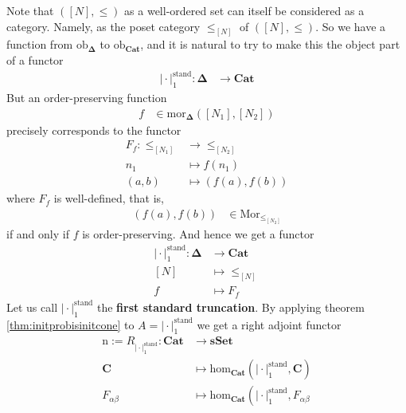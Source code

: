 \begin{cst}[Nerve]
\label{cst:nerve}
Note that $([N],\leq)$ as a well-ordered set can itself be considered as a category.
Namely, as the poset category $\pmb{\leq}_{[N]}$ of $([N],\leq)$.
So we have a function from $\mathrm{ob}_{\mathbf{\Delta}}$ to $\mathrm{ob}_{\mathbf{Cat}}$, and it is natural to try to make this the object part of a functor
\begin{align*}
  \vert
    \cdot
  \vert_{1}^{\textrm{stand}}
  \colon
  \mathbf{\Delta}
  &\rightarrow
  \mathbf{Cat}
\end{align*}
But an order-preserving function
\begin{align*}
  f
  &\in
  \mathrm{mor}_{\mathbf{\Delta}}
  \left(
    [N_{1}],
    [N_{2}]
  \right)
\end{align*}
precisely corresponds to the functor
\begin{align*}
  F_{f}
  \colon
  \pmb{\leq}_{[N_{1}]}
  &\rightarrow
  \pmb{\leq}_{[N_{2}]}
  \\
  n_{1}
  &\mapsto
  f(n_{1})
  \\
  (a,b)
  &\mapsto
  (f(a),f(b))
\end{align*}
where $F_{f}$ is well-defined, that is,
\begin{align*}
  (f(a),f(b))
  &\in
  \mathrm{Mor}_{\pmb{\leq}_{[N_{2}]}}
\end{align*}
if and only if $f$ is order-preserving.
And hence we get a functor
\begin{align*}
  \vert
    \cdot
  \vert_{1}^{\textrm{stand}}
  \colon
  \mathbf{\Delta}
  &\rightarrow
  \mathbf{Cat}
  \\
  [N]
  &\mapsto
  \pmb{\leq}_{[N]}
  \\
  f
  &\mapsto
  F_{f}
\end{align*}
Let us call $\vert \cdot \vert_{1}^{\textrm{stand}}$ the \textbf{first standard truncation}.
By applying theorem \ref{thm:initprobisinitcone} to $A = \vert \cdot \vert_{1}^{\textrm{stand}}$ we get a right adjoint functor
\begin{align*}
  \mathrm{n}
  :=
  R_{\vert \cdot \vert_{1}^{\textrm{stand}}}
  \colon
  \mathbf{Cat}
  &\rightarrow
  \mathbf{sSet}
  \\
  \mathbf{C}
  &\mapsto
  \mathrm{hom}_{\mathbf{Cat}}
  \left(
    \vert
      \cdot
    \vert_{1}^{\textrm{stand}},
    \mathbf{C}
  \right)
  \\
  F_{\alpha\beta}
  &\mapsto
  \mathrm{hom}_{\mathbf{Cat}}
  \left(
    \vert
      \cdot
    \vert_{1}^{\textrm{stand}},
    F_{\alpha\beta}

\end{align*}
\end{cst}
